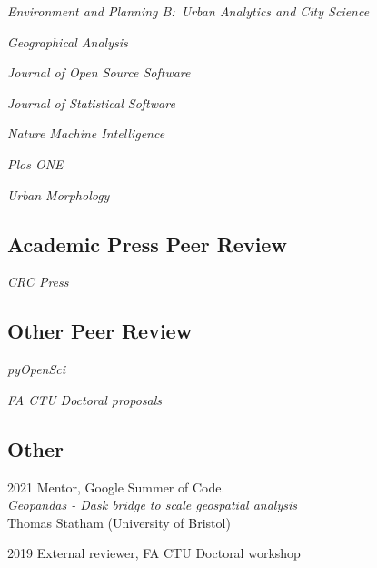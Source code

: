 \documentclass[12pt,a4paper]{report}
\newcommand{\listitemspace}{0.25em}
\renewenvironment{itemize}
{\begin{list}{}{\setlength{\leftmargin}{0em}
                \setlength{\parskip}{0em}
                \setlength{\itemsep}{\listitemspace}
                \setlength{\parsep}{\listitemspace}}}
{\end{list}}
\begin{document}
    \begin{itemize}

        \item \textit{Environment and Planning B:\ Urban Analytics and City Science}
        \item \textit{Geographical Analysis}
        \item \textit{Journal of Open Source Software}
        \item \textit{Journal of Statistical Software}
        \item \textit{Nature Machine Intelligence}
        \item \textit{Plos ONE}
        \item \textit{Urban Morphology}

    \end{itemize}

    \subsection*{Academic Press Peer Review}

    \begin{itemize}

        \item \textit{CRC Press}

    \end{itemize}

    \subsection*{Other Peer Review}

    \begin{itemize}

        \item \textit{pyOpenSci}
        \item \textit{FA CTU Doctoral proposals}

    \end{itemize}

    \subsection*{Other}

    \begin{tablist}

        \item[2021] \tab{}Mentor, Google Summer of Code. \\
                          \textit{Geopandas - Dask bridge to scale geospatial analysis} \\
                          Thomas Statham (University of Bristol)

        \item[2019] \tab{}External reviewer, FA CTU Doctoral workshop

    \end{tablist}
\end{document}
